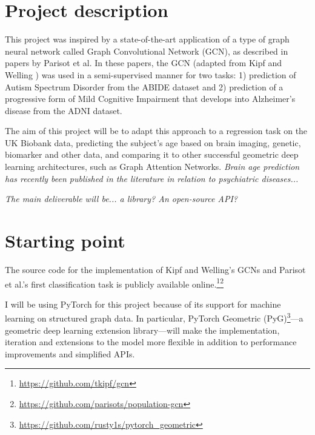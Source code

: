 \documentclass[12pt,a4paper,twoside]{article}
\begin{document}
\section*{Project description}
This project was inspired by a state-of-the-art application of a type of graph neural network called Graph Convolutional Network (GCN), as described in papers by Parisot et al. \cite{parisot2017spectral, parisot2018disease} In these papers, the GCN (adapted from Kipf and Welling \cite{kipf2017semi}) was used in a semi-supervised manner for two tasks: 1) prediction of Autism Spectrum Disorder from the ABIDE dataset and 2) prediction of a progressive form of Mild Cognitive Impairment that develops into Alzheimer's disease from the ADNI dataset.

The aim of this project will be to adapt this approach to a regression task on the UK Biobank data, predicting the subject's age based on brain imaging, genetic, biomarker and other data, and comparing it to other successful geometric deep learning architectures, such as Graph Attention Networks. \textit{Brain age prediction has recently been published in the literature in relation to psychiatric diseases...}

\textit{The main deliverable will be... a library? An open-source API?}

\section*{Starting point}

The source code for the implementation of Kipf and Welling's \cite{kipf2017semi} GCNs and Parisot et al.'s \cite{parisot2018disease} first classification task is publicly available online.\footnote{\url{https://github.com/tkipf/gcn}}\footnote{\url{https://github.com/parisots/population-gcn}}

I will be using PyTorch for this project because of its support for machine learning on structured graph data. In particular, PyTorch Geometric (PyG)\footnote{\url{https://github.com/rusty1s/pytorch_geometric}}—a geometric deep learning extension library—will make the implementation, iteration and extensions to the model more flexible in addition to performance improvements and simplified APIs.
\end{document}
